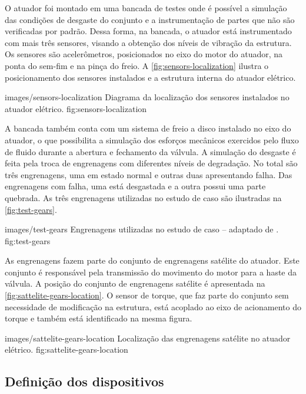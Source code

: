 O atuador foi montado em uma bancada de testes onde é possível a simulação das condições de desgaste
do conjunto e a instrumentação de partes que não são verificadas por padrão. Dessa forma, na
bancada, o atuador está instrumentado com mais três sensores, visando a obtenção dos níveis de
vibração da estrutura. Os sensores são acelerômetros, posicionados no eixo do motor do atuador, na
ponta do sem-fim e na pinça do freio. A \cref{fig:sensors-localization} ilustra o posicionamento dos
sensores instalados e a estrutura interna do atuador elétrico.


  {images/sensors-localization}
  {Diagrama da localização dos sensores instalados no atuador elétrico.}
  {fig:sensors-localization}

A bancada também conta com um sistema de freio a disco instalado no eixo do atuador, o que
possibilita a simulação dos esforços mecânicos exercidos pelo fluxo de fluido durante a abertura e
fechamento da válvula. A simulação do desgaste é feita pela troca de engrenagens com diferentes
níveis de degradação. No total são três engrenagens, uma em estado normal e outras duas apresentando
falha. Das engrenagens com falha, uma está desgastada e a outra possui uma parte quebrada. As três
engrenagens utilizadas no estudo de caso são ilustradas na \cref{fig:test-gears}.

  {images/test-gears}
  {Engrenagens utilizadas no estudo de caso -- adaptado de \cite{lazzaretti2012avaliacao}.}
  {fig:test-gears}

As engrenagens fazem parte do conjunto de engrenagens satélite do atuador. Este conjunto é
responsável pela transmissão do movimento do motor para a haste da válvula. A posição do conjunto de
engrenagens satélite é apresentada na \cref{fig:sattelite-gears-location}. O sensor de torque, que
faz parte do conjunto sem necessidade de modificação na estrutura, está acoplado ao eixo de
acionamento do torque e também está identificado na mesma figura.

  {images/sattelite-gears-location}
  {Localização das engrenagens satélite no atuador elétrico.}
  {fig:sattelite-gears-location}


\subsection{Definição dos dispositivos}

